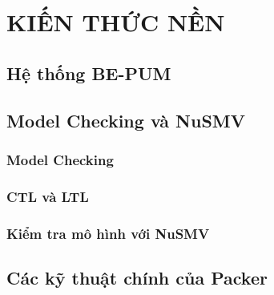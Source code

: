 
\newpage
\chapter{KIẾN THỨC NỀN}

\section{Hệ thống BE-PUM}

\section{Model Checking và NuSMV}

\subsection{Model Checking}

\subsection{CTL và LTL}

\subsection{Kiểm tra mô hình với NuSMV}

\section{Các kỹ thuật chính của Packer}

